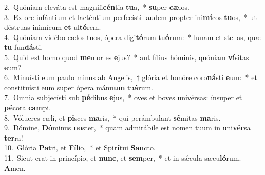 {2.~}Quóniam eleváta est magnifi\textbf{cén}tia \textbf{tu}a,~* \textbf{su}per \textbf{cæ}los.\\
{3.~}Ex ore infántium et lacténtium perfecísti laudem propter ini\textbf{mí}cos \textbf{tu}os,~* ut déstruas inimícum \textbf{et} ul\textbf{tó}rem.\\
{4.~}Quóniam vidébo cælos tuos, ópera digi\textbf{tó}rum tu\textbf{ó}rum:~* lunam et stellas, quæ \textbf{tu} fun\textbf{dá}sti.\\
{5.~}Quid est homo quod \textbf{me}mor es \textbf{e}jus?~* aut fílius hóminis, quóniam \textbf{ví}sitas \textbf{e}um?\\
{6.~}Minuísti eum paulo minus ab Angelis,~† glória et honóre coro\textbf{ná}sti \textbf{e}um:~* et constituísti eum super ópera mánu\textbf{um} tu\textbf{á}rum.\\
{7.~}Omnia subjecísti sub \textbf{pé}dibus \textbf{e}jus,~* oves et boves univérsas: ínsuper et \textbf{pé}cora \textbf{cam}pi.\\
{8.~}Vólucres cæli, et \textbf{pi}sces \textbf{ma}ris,~* qui perámbulant \textbf{sé}mitas \textbf{ma}ris.\\
{9.~}Dómine, \textbf{Dó}minus \textbf{no}ster,~* quam admirábile est nomen tuum in uni\textbf{vér}sa \textbf{ter}ra!\\
{10.~}Glória \textbf{Pa}tri, et \textbf{Fí}lio,~* et Spi\textbf{rí}tui \textbf{San}cto.\\
{11.~}Sicut erat in princípio, et \textbf{nunc}, et \textbf{sem}per,~* et in sǽcula sæcu\textbf{ló}rum. \textbf{A}men.\\

